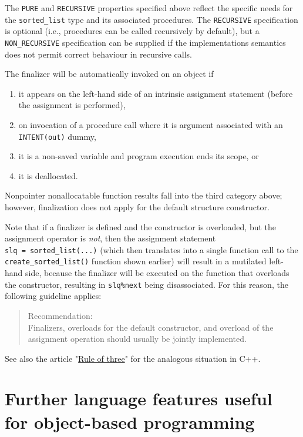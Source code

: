 \documentclass[]{scrartcl}
\providecommand{\tightlist}{%
  \setlength{\itemsep}{0pt}\setlength{\parskip}{0pt}}
\begin{document}
The \texttt{PURE} and \texttt{RECURSIVE} properties specified above
reflect the specific needs for the \texttt{sorted\_list} type and its
associated procedures. The \texttt{RECURSIVE} specification is optional
(i.e., procedures can be called recursively by default), but a
\texttt{NON\_RECURSIVE} specification can be supplied if the
implementation\textquotesingle s semantics does not permit correct
behaviour in recursive calls.

The finalizer will be automatically invoked on an object if

\begin{enumerate}
\def\labelenumi{\arabic{enumi}.}
\tightlist
\item
  it appears on the left-hand side of an intrinsic assignment statement
  (before the assignment is performed),
\item
  on invocation of a procedure call where it is argument associated with
  an \texttt{INTENT(out)} dummy,
\item
  it is a non-saved variable and program execution ends its scope, or
\item
  it is deallocated.
\end{enumerate}

Nonpointer nonallocatable function results fall into the third category
above; however, finalization does not apply for the default structure
constructor.

Note that if a finalizer is defined and the constructor is overloaded,
but the assignment operator is \emph{not}, then the assignment statement
\texttt{slq\ =\ sorted\_list(...)} (which then translates into a single
function call to the \texttt{create\_sorted\_list()} function shown
earlier) will result in a mutilated left-hand side, because the
finalizer will be executed on the function that overloads the
constructor, resulting in \texttt{slq\%next} being disassociated. For
this reason, the following guideline applies:

\begin{quote}
Recommendation:\\
Finalizers, overloads for the default constructor, and overload of the
assignment operation should usually be jointly implemented.
\end{quote}

See also the article
"\href{https://en.wikipedia.org/wiki/Rule_of_three_(C\%2B\%2B_programming)}{Rule
of three}" for the analogous situation in C++.

\section{Further language features useful for object-based
programming}\label{further-language-features-useful-for-object-based-programming}
\end{document}
